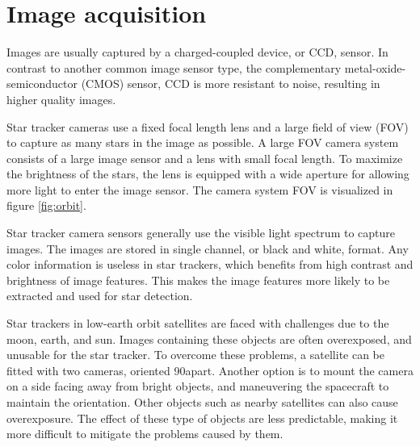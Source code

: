 \documentclass[12pt]{report}
\begin{document}
\section{Image acquisition}
Images are usually captured by a charged-coupled device, or CCD, sensor. In contrast to another common image sensor type, the complementary metal-oxide-semiconductor (CMOS) sensor, CCD is more resistant to noise, resulting in higher quality images.
\citep*{SatDesgin}
\par
Star tracker cameras use a fixed focal length lens and a large field of view (FOV) to capture as many stars in the image as possible. A large FOV camera system consists of a large image sensor and a lens with small focal length. To maximize the brightness of the stars, the lens is equipped with a wide aperture for allowing more light to enter the image sensor. The camera system FOV is visualized in figure \ref*{fig:orbit}. \citep*{SatDesgin}
\par
Star tracker camera sensors generally use the visible light spectrum to capture images. The images are stored in single channel, or black and white, format. Any color information is useless in star trackers, which  benefits from high contrast and brightness of image features. This makes the image features more likely to be extracted and used for star detection. \citep*{SatDesgin}
\par
Star trackers in low-earth orbit satellites are faced with challenges due to the moon, earth, and sun. Images containing these objects are often overexposed, and unusable for the star tracker. To overcome these problems, a satellite can be fitted with two cameras, oriented 90\textdegree apart. Another option is to mount the camera on a side facing away from bright objects, and maneuvering the spacecraft to maintain the orientation. Other objects such as nearby satellites can also cause overexposure. The effect of these type of objects are less predictable, making it more difficult to mitigate the problems caused by them. \citep*{SatDesgin}
\end{document}

